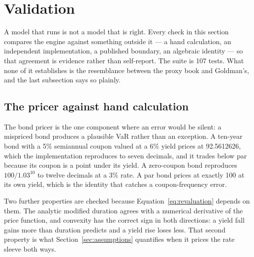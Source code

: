 %
%

\section{Validation}\label{sec:validation}

A model that runs is not a model that is right. Every check in this section
compares the engine against something outside it --- a hand calculation, an
independent implementation, a published boundary, an algebraic identity --- so
that agreement is evidence rather than self-report. The suite is 107 tests.
What none of it establishes is the resemblance between the proxy book and
Goldman's, and the last subsection says so plainly.

\subsection{The pricer against hand calculation}

The bond pricer is the one component where an error would be silent: a
mispriced bond produces a plausible VaR rather than an exception. A ten-year
bond with a 5\% semiannual coupon valued at a 6\% yield prices at
92.5612626, which the implementation reproduces to seven decimals, and it
trades below par because its coupon is a point under its yield. A zero-coupon
bond reproduces $100/1.03^{10}$ to twelve decimals at a 3\% rate. A par bond
prices at exactly 100 at its own yield, which is the identity that catches a
coupon-frequency error.

Two further properties are checked because
Equation~\eqref{eq:revaluation} depends on them. The analytic modified duration
agrees with a numerical derivative of the price function, and convexity has the
correct sign in both directions: a yield fall gains more than duration predicts
and a yield rise loses less. That second property is what
Section~\ref{sec:assumptions} quantifies when it prices the rate sleeve both
ways.

